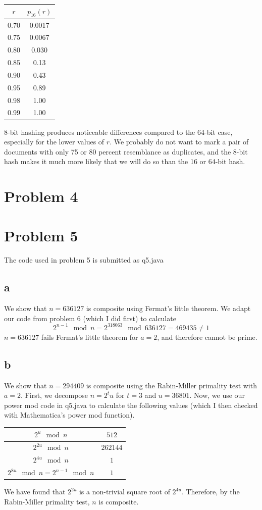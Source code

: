 \documentclass{article}
\begin{document}
\begin{center}
\begin{tabular}{ | c | c | }
\hline
$r$ & $p_{16}(r)$ \\
\hline\hline
0.70 & 0.0017 \\
\hline
0.75 & 0.0067\\
\hline
0.80 & 0.030\\
\hline
0.85 & 0.13\\
\hline
0.90 & 0.43\\
\hline
0.95 & 0.89\\
\hline
0.98 & 1.00 \\
\hline
0.99 & 1.00 \\ 
\hline

\end{tabular}
\end{center}
8-bit hashing produces noticeable differences compared to the 64-bit case, especially for the lower values of $r$. We probably do not want to mark a pair of documents with only 75 or 80 percent resemblance as duplicates, and the 8-bit hash makes it much more likely that we will do so than the 16 or 64-bit hash. 

\section*{Problem 4}

\section*{Problem 5}
The code used in problem 5 is submitted as q5.java
\subsection*{a}
We show that $n=636127$ is composite using Fermat's little theorem. We adapt our code from problem 6 (which I did first) to calculate
$$2^{n-1} \mod n = 2^{318063} \mod 636127 = 469435 \neq 1$$
$n=636127$ fails Fermat's little theorem for $a=2$, and therefore cannot be prime.  
\subsection*{b}
We show that $n=294409$ is composite using the Rabin-Miller primality test with $a=2$. First, we decompose $n = 2^t u$ for $t=3$ and $u=36801$. Now, we use our power mod code in q5.java to calculate the following values (which I then checked with Mathematica's power mod function). 

\begin{center}
\begin{tabular}{ | c | c |}
\hline
$ 2^u \mod n$ & $512$ \\
\hline
$ 2^{2u} \mod n$ & $262144$ \\
\hline
$ 2^{4u} \mod n$ & $1$ \\
\hline
$ 2 ^ {8u} \mod n = 2^{n-1} \mod n$ & $1$ \\
\hline
\end{tabular}
\end{center}
We have found that $2^{2u}$ is a non-trivial square root of $2^{4u}$. Therefore, by the Rabin-Miller primality test, $n$ is composite. 
\end{document}

